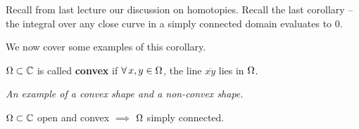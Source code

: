\setcounter{section}{0}
\setcounter{theorem}{0}


Recall from last lecture our discussion on homotopies. Recall the last corollary -- the integral over any close curve in a simply connected domain evaluates to $0$.

We now cover some examples of this corollary.


\begin{definition}
$\Omega \subset \mathbb{C}$ is called \textbf{convex} if $\forall \, x, y \in \Omega$, the line $\overline{ x y }$ lies in $\Omega$.

\begin{center}


\textit{An example of a convex shape and a non-convex shape.}
\end{center}
\end{definition}


\begin{proposition}
$\Omega \subset \mathbb{C}$ open and convex $\implies$ $\Omega$ simply connected.
\end{proposition}

